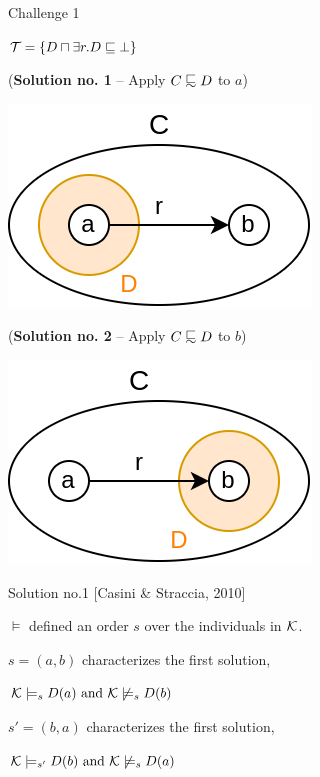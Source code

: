 \documentclass[10pt]{beamer}
\begin{document}
\begin{frame}[fragile]{Challenge 1}

\begin{center}
  $\mathcal{T} = \{D \sqcap \exists r.D \sqsubseteq \bot \}$
\end{center}

\pause

(\textbf{Solution no. 1} -- Apply $C \definc D$ to $a$)

\begin{center}
  \includegraphics[scale=0.35]{img/challenge1_2.png}
\end{center}
  
\pause
\vspace{0.2cm}

(\textbf{Solution no. 2} -- Apply $C \definc D$ to $b$)

\begin{center}
  \includegraphics[scale=0.35]{img/challenge1_3.png}
\end{center}

\end{frame}

\begin{frame}{Solution no.1 [Casini \& Straccia, 2010]}
  
  $\models$ defined \wrt an order $s$ over the individuals in $\mathcal{K}$.

  \pause
  \vspace{0.7cm}

  $s = (a, b)$ characterizes the first solution, \ie 

  $\mathcal{K} \models_s D(a) \text{ and } \mathcal{K} \not \models_s D(b)$

  \vspace{0.7cm}

  $s' = (b, a)$ characterizes the first solution, \ie 

  $\mathcal{K} \models_{s'} D(b) \text{ and } \mathcal{K} \not \models_s D(a)$

\end{frame}
\end{document}

